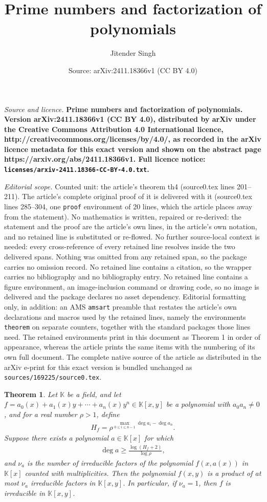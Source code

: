 \documentclass[10pt,a4paper]{amsart}
\title{\bf Prime numbers and factorization of polynomials}
\author{Jitender Singh}
\date{Source: arXiv:2411.18366v1 (CC BY 4.0)}
\newcommand{\K}{\mathbb{K}}
\newtheorem{theorem}{Theorem}
\begin{document}
\maketitle

\noindent\emph{Source and licence.} \bf Prime numbers and factorization of polynomials. Version arXiv:2411.18366v1 (CC BY 4.0), distributed by arXiv under the Creative Commons Attribution 4.0 International licence, http://creativecommons.org/licenses/by/4.0/, as recorded in the arXiv licence metadata for this exact version and shown on the abstract page https://arxiv.org/abs/2411.18366v1. Full licence notice: \texttt{licenses/arxiv-2411.18366-CC-BY-4.0.txt}.\par\smallskip

\noindent\textit{Editorial scope.} Counted unit: the article's theorem th4 (source0.tex lines 201--211). The article's complete original proof of it is delivered with it (source0.tex lines 285--304, one \texttt{proof} environment of 20 lines, which the article places away from the statement). No mathematics is written, repaired or re-derived: the statement and the proof are the article's own lines, in the article's own notation, and no retained line is substituted or re-flowed.  No further source-local context is needed: every cross-reference of every retained line resolves inside the two delivered spans.  Nothing was omitted from any retained span, so the package carries no omission record.  No retained line contains a citation, so the wrapper carries no bibliography and no bibliography entry.  No retained line contains a figure environment, an image-inclusion command or drawing code, so no image is delivered and the package declares no asset dependency.  Editorial formatting only, in addition: an AMS \texttt{amsart} preamble that restates the article's own declarations and macros used by the retained lines, namely the environments \texttt{theorem} on separate counters, together with the standard packages those lines need.  The retained environments print in this document as Theorem 1 in order of appearance, whereas the article prints the same items with the numbering of its own full document.  The complete native source of the article as distributed in the arXiv e-print for this exact version is bundled unchanged as \texttt{sources/169225/source0.tex}.
\begin{theorem}\label{th4}
 Let $\K$ be a field, and let $f=a_0(x)+a_1(x)y+\cdots+a_n(x)y^n\in \K[x,y]$ be a  polynomial with $a_0a_n\neq 0$, and for a real number $\rho>1$, define
 \begin{eqnarray*}
 H_f=\rho^{\max_{0\leq i\leq n-1}\deg a_i-\deg a_n}.
 \end{eqnarray*}
  Suppose there exists a polynomial $a\in \K[x]$ for which
 \begin{eqnarray*}
              \deg a\geq  \frac{\log(H_f+2)}{\log \rho},
 \end{eqnarray*}
  and $\nu_a$ is the number of irreducible factors of the polynomial $f(x,a(x))$ in $\K[x]$ counted with multiplicities. Then  the polynomial $f(x,y)$ is a product of at most $\nu_a$ irreducible factors in $\K[x,y]$. In particular, if $\nu_a=1$, then $f$ is irreducible in $\K[x,y]$.
\end{theorem}
\end{document}
